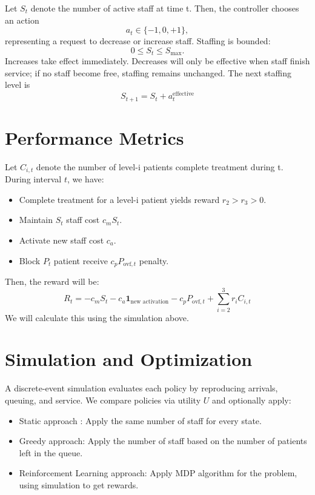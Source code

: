 \documentclass{article}
\begin{document}
Let $S_t$ denote the number of active staff at time t. Then, the controller chooses an action
\[
a_t \in \{-1,0,+1\},
\]
representing a request to decrease or increase staff. Staffing is bounded:
\[
0 \le S_t \le S_{\max}.
\]
Increases take effect immediately. Decreases will only be effective when staff finish
service; if no staff become free, staffing remains unchanged. The next staffing
level is
\[
S_{t+1} = S_t + a^{\text{effective}}_t
\]
\section*{Performance Metrics}
Let $C_{i, t}$ denote the number of level-i patients complete treatment during t.\\
During interval $t$, we have:
\begin{itemize}
    \item Complete treatment for a level-i patient yields reward $r_2 > r_3 > 0$.
    \item Maintain $S_t$ staff cost $c_m S_t$.
    \item Activate new staff cost $c_a$.
    \item Block $P_t$ patient receive $c_p P_{\text{ovf}, t}$ penalty.
\end{itemize}
Then, the reward will be:
\[R_t = - c_m S_t - c_a\mathbf{1}_\text{new activation}- c_p P_{\text{ovf}, t} + \sum_{i=2}^{3} r_iC_{i, t}\]
We will calculate this using the simulation above.

\section*{Simulation and Optimization}
A discrete-event simulation evaluates each policy by reproducing arrivals, queuing, and service. We compare policies via utility $U$ and optionally apply:
\begin{itemize}
    \item Static approach : Apply the same number of staff for every state.
    \item Greedy approach: Apply the number of staff based on the number of patients left in the queue.
    \item Reinforcement Learning approach: Apply MDP algorithm for the problem, using simulation to get rewards.
\end{itemize}
\end{document}
